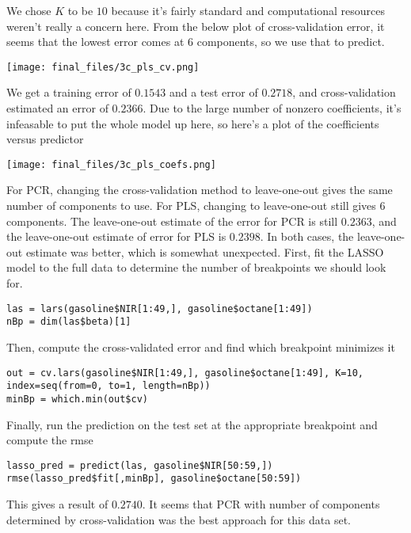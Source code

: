\documentclass{article}
\begin{document}
We chose $K$ to be $10$ because it's fairly standard and computational resources weren't really a concern here.
From the below plot of cross-validation error, it seems that the lowest error comes at $6$ components, so we use that to predict.

\texttt{[image: final\_files/3c\_pls\_cv.png]}

We get a training error of $0.1543$ and a test error of $0.2718$, and cross-validation estimated an error of $0.2366$. Due to the large number of nonzero coefficients, it's infeasable to put the whole model up here, so here's a plot of the coefficients versus predictor

\texttt{[image: final\_files/3c\_pls\_coefs.png]}

For PCR, changing the cross-validation method to leave-one-out gives the same number of components to use. For PLS, changing to leave-one-out still gives $6$ components. The leave-one-out estimate of the error for PCR is still $0.2363$, and the leave-one-out estimate of error for PLS is $0.2398$. In both cases, the leave-one-out estimate was better, which is somewhat unexpected. 
First, fit the LASSO model to the full data to determine the number of breakpoints we should look for.
\begin{verbatim}
las = lars(gasoline$NIR[1:49,], gasoline$octane[1:49])
nBp = dim(las$beta)[1]
\end{verbatim}
Then, compute the cross-validated error and find which breakpoint minimizes it
\begin{verbatim}
out = cv.lars(gasoline$NIR[1:49,], gasoline$octane[1:49], K=10, index=seq(from=0, to=1, length=nBp))
minBp = which.min(out$cv)
\end{verbatim}
Finally, run the prediction on the test set at the appropriate breakpoint and compute the rmse
\begin{verbatim}
lasso_pred = predict(las, gasoline$NIR[50:59,])
rmse(lasso_pred$fit[,minBp], gasoline$octane[50:59])
\end{verbatim}
This gives a result of $0.2740$. It seems that PCR with number of components determined by cross-validation was the best approach for this data set.
\end{document}
